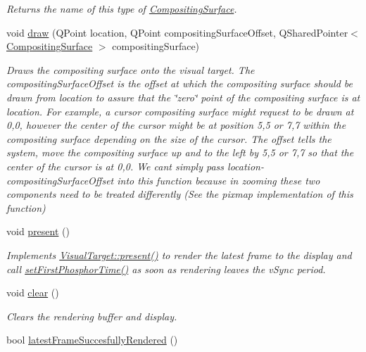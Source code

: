 \begin{DoxyCompactItemize}
\begin{DoxyCompactList}\small\item\em Returns the name of this type of \hyperlink{struct_picto_1_1_compositing_surface}{Compositing\-Surface}. \end{DoxyCompactList}\item 
void \hyperlink{class_picto_1_1_d3_d_visual_target_a224bdcaf5f14bffb7445f7be624b7854}{draw} (Q\-Point location, Q\-Point compositing\-Surface\-Offset, Q\-Shared\-Pointer$<$ \hyperlink{struct_picto_1_1_compositing_surface}{Compositing\-Surface} $>$ compositing\-Surface)
\begin{DoxyCompactList}\small\item\em Draws the compositing surface onto the visual target. The compositing\-Surface\-Offset is the offset at which the compositing surface should be drawn from location to assure that the \char`\"{}zero\char`\"{} point of the compositing surface is at location. For example, a cursor compositing surface might request to be drawn at 0,0, however the center of the cursor might be at position 5,5 or 7,7 within the compositing surface depending on the size of the cursor. The offset tells the system, move the compositing surface up and to the left by 5,5 or 7,7 so that the center of the cursor is at 0,0. We cant simply pass location-\/compositing\-Surface\-Offset into this function because in zooming these two components need to be treated differently (See the pixmap implementation of this function) \end{DoxyCompactList}\item 
void \hyperlink{class_picto_1_1_d3_d_visual_target_ae40201fd4e6f0a866ff7af9b95ea1c9d}{present} ()
\begin{DoxyCompactList}\small\item\em Implements \hyperlink{class_picto_1_1_visual_target_a914177dc74348568b08aed7dc88648e8}{Visual\-Target\-::present()} to render the latest frame to the display and call \hyperlink{class_picto_1_1_visual_target_abd0a5d10da5c642cb6e31f39635628ed}{set\-First\-Phosphor\-Time()} as soon as rendering leaves the v\-Sync period. \end{DoxyCompactList}\item 
void \hyperlink{class_picto_1_1_d3_d_visual_target_a98c6b55afc7098a156fbca67415f7f7e}{clear} ()
\begin{DoxyCompactList}\small\item\em Clears the rendering buffer and display. \end{DoxyCompactList}\item 
\hypertarget{class_picto_1_1_d3_d_visual_target_a7eaf842bb33a22c71d111f16205f9afa}{bool \hyperlink{class_picto_1_1_d3_d_visual_target_a7eaf842bb33a22c71d111f16205f9afa}{latest\-Frame\-Succesfully\-Rendered} ()}\label{class_picto_1_1_d3_d_visual_target_a7eaf842bb33a22c71d111f16205f9afa}


\end{DoxyCompactItemize}
